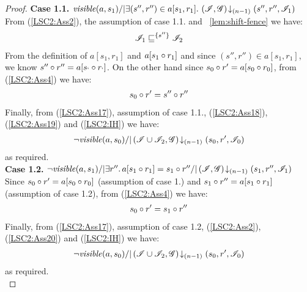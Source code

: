 \begin{lemma}
\begin{proof}
\noindent\textbf{Case 1.1. }
$\mathit{visible}(a, s_1) /| \exists (s'', r'') \in a[s_1, r_1].\, \left(\mathscr{I}, \mathscr{G}\right) \!\downarrow_{(n-1)} \left(s'', r'', \mathscr{I}_1\right)$\\
From (\ref{LSC2:Ass2}), the assumption of case 1.1. and \lem~\ref{lem:shift-fence} we have:
%
\begin{align}
	\mathscr{I}_1 \sqsubseteq^{\{s''\}} \mathscr{I}_2 \label{LSC2:Ass18}
\end{align}
%
From the definition of $a[s_1, r_1]$ and $a[s_1 \circ r_1]$ and since $(s'', r'') \in a[s_1, r_1]$, we know $s'' \circ r'' = a[s_` \circ r_`]$. On the other hand since $s_0 \circ r' = a[s_0 \circ r_0]$, from (\ref{LSC2:Ass4}) we have:
%
\begin{align}
	s_0 \circ r' = s'' \circ r'' \label{LSC2:Ass19}
\end{align}
%
Finally, from (\ref{LSC2:Ass17}), assumption of case 1.1., (\ref{LSC2:Ass18}), (\ref{LSC2:Ass19}) and (\ref{LSC2:IH}) we have: 
%
\begin{align*}
	\neg\mathit{visible}(a, s_0) /| \left(\mathscr{I} \cup \mathscr{I}_2, \mathscr{G}\right) \!\downarrow_{(n-1)} \left(s_0, r', \mathscr{I}_0\right)
\end{align*}
%
as required.\\

\noindent\textbf{Case 1.2. }
$\neg\mathit{visible}(a, s_1) /| \exists r''.\, a[s_1 \circ r_1] = s_1 \circ r'' /| \left(\mathscr{I}, \mathscr{G}\right) \!\downarrow_{(n-1)} \left(s_1, r'', \mathscr{I}_1\right)$\\
Since $s_0 \circ r' = a[s_0 \circ r_0]$ (assumption of case 1.) and $s_1 \circ r'' = a[s_1 \circ r_1]$ (assumption of case 1.2), from (\ref{LSC2:Ass4}) we have:
%
\begin{align}
	s_0 \circ r' = s_1 \circ r'' \label{LSC2:Ass20}
\end{align}
%
Finally, from (\ref{LSC2:Ass17}), assumption of case 1.2, (\ref{LSC2:Ass2}), (\ref{LSC2:Ass20}) and (\ref{LSC2:IH}) we have: 
%
\begin{align*}
	\neg\mathit{visible}(a, s_0) /| \left(\mathscr{I} \cup \mathscr{I}_2, \mathscr{G}\right) \!\downarrow_{(n-1)} \left(s_0, r', \mathscr{I}_0\right)
\end{align*}
%
as required.\\
%
%
%
%


\end{proof}
\end{lemma}
